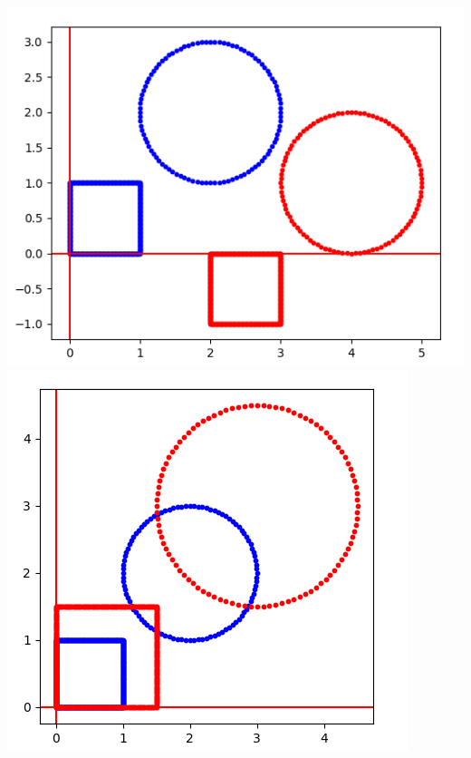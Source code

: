 \documentclass[11pt,class=report,crop=false]{standalone}
\begin{document}
\begin{activite}
\begin{enumerate}
\begin{center}
\includegraphics[scale=\myscale,scale=0.4]{ecran-complexes2-5a}\quad
\includegraphics[scale=\myscale,scale=0.4]{ecran-complexes2-5b}


\end{center}
\end{enumerate}
\end{activite}
\end{document}
